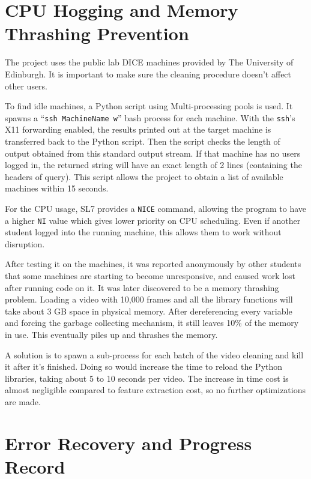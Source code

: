 \documentclass[bsc,logo,twoside,fullspacing,parskip]{infthesis}
\begin{document}
\section{CPU Hogging and Memory Thrashing Prevention}

The project uses the public lab DICE machines provided by The University of Edinburgh. 
It is important to make sure the cleaning procedure doesn't affect other users.

To find idle machines, a Python script using Multi-processing pools is used. 
It spawns a ``{\tt ssh MachineName w}'' bash process for each machine.
With the {\tt ssh}'s X11 forwarding enabled, the results printed out at the target machine is transferred back to the Python script. 
Then the script checks the length of output obtained from this standard output stream. 
If that machine has no users logged in, the returned string will have an exact length of 2 lines (containing the headers of query). 
This script allows the project to obtain a list of available machines within 15 seconds.

For the CPU usage, SL7 provides a {\tt NICE} command, allowing the program to have a higher {\tt NI} value which gives lower priority on CPU scheduling. Even if another student logged into the running machine, this allows them to work without disruption.

After testing it on the machines, it was reported anonymously by other students that some machines are starting to become unresponsive, and caused work lost after running code on it. It was later discovered to be a memory thrashing problem.
Loading a video with 10,000 frames and all the library functions will take about 3 GB space in physical memory. 
After dereferencing every variable and forcing the garbage collecting mechanism, it still leaves 10\% of the memory in use. This eventually piles up and thrashes the memory. 

A solution is to spawn a sub-process for each batch of the video cleaning and kill it after it's finished. 
Doing so would increase the time to reload the Python libraries, taking about 5 to 10 seconds per video. 
The increase in time cost is almost negligible compared to feature extraction cost, so no further optimizations are made. 


\section{Error Recovery and Progress Record}
\end{document}
